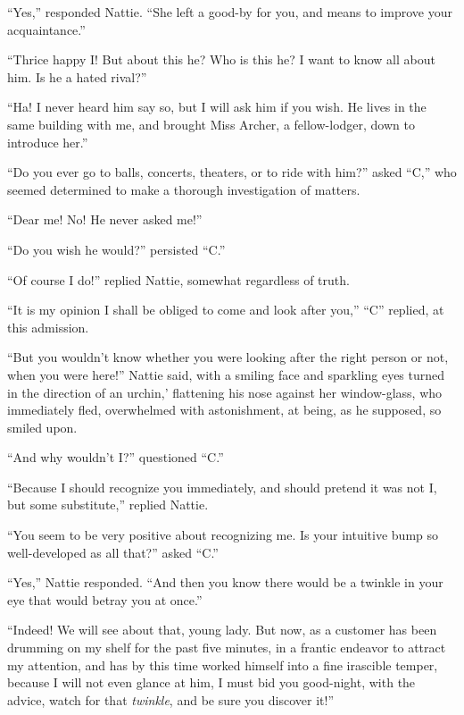 ``Yes,'' responded Nattie. ``She left a good-by for you, and means to
improve your acquaintance.''

``Thrice happy I! But about this he? Who is this he? I want to know all
about him. Is he a hated rival?''

``Ha! I never heard him say so, but I will ask him if you wish. He lives
in the same building with me, and brought Miss Archer, a fellow-lodger,
down to introduce her.''

``Do you ever go to balls, concerts, theaters, or to ride with him?''
asked ``C,'' who seemed determined to make a thorough investigation of
matters.

``Dear me! No! He never asked me!''

``Do you wish he would?'' persisted ``C.''

``Of course I do!'' replied Nattie, somewhat regardless of truth.

``It is my opinion I shall be obliged to come and look after you,'' ``C''
replied, at this admission.

``But you wouldn't know whether you were looking after the right person
or not, when you were here!'' Nattie said, with a smiling face and
sparkling eyes turned in the direction of an urchin,' flattening his
nose against her window-glass, who immediately fled, overwhelmed with
astonishment, at being, as he supposed, so smiled upon.

``And why wouldn't I?'' questioned ``C.''

``Because I should recognize you immediately, and should pretend it was
not I, but some substitute,'' replied Nattie.

``You seem to be very positive about recognizing me. Is your intuitive
bump so well-developed as all that?'' asked ``C.''

``Yes,'' Nattie responded. ``And then you know there would be a twinkle in
your eye that would betray you at once.''

``Indeed! We will see about that, young lady. But now, as a customer has
been drumming on my shelf for the past five minutes, in a frantic
endeavor to attract my attention, and has by this time worked himself
into a fine irascible temper, because I will not even glance at him, I
must bid you good-night, with the advice, watch for that \emph{twinkle}, and be
sure you discover it!''








